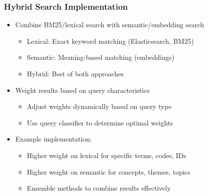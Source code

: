 {    \begin{frame}
        \frametitle{Hybrid Search Implementation}
        \begin{itemize}
            \item Combine BM25/lexical search with semantic/embedding search
            \begin{itemize}
                \item Lexical: Exact keyword matching (Elasticsearch, BM25)
                \item Semantic: Meaning-based matching (embeddings)
                \item Hybrid: Best of both approaches
            \end{itemize}
            \item Weight results based on query characteristics
            \begin{itemize}
                \item Adjust weights dynamically based on query type
                \item Use query classifier to determine optimal weights
            \end{itemize}
            \item Example implementation:
            \begin{itemize}
                \item Higher weight on lexical for specific terms, codes, IDs
                \item Higher weight on semantic for concepts, themes, topics
                \item Ensemble methods to combine results effectively
            \end{itemize}
        \end{itemize}
    \end{frame}

}
